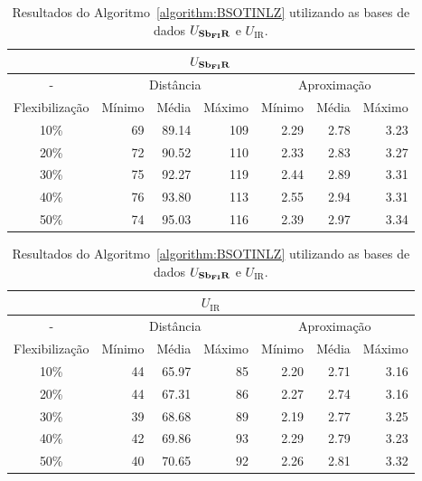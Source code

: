 \begin{table}[!htb]
  \caption{Resultados do Algoritmo~\ref{algorithm:BSOTINLZ} utilizando as bases de dados $U_{\textbf{Sb\textsubscript{FI}R}}{}$ e $U_{\text{IR}}$.}
  \label{table:APQPJYRX}
  \centering
  \begin{tabular}{|c|r|r|r|r|r|r|}
    \hline
    \multicolumn{7}{|c|}{$U_{\textbf{Sb\textsubscript{FI}R}}{}$}                                                                       \\ \hline
      -            & \multicolumn{3}{c|}{Distância}             & \multicolumn{3}{c|}{Aproximação}           \\ \hline
    Flexibilização & Mínimo       & Média        & Máximo       & Mínimo       & Média        & Máximo       \\ \hline  
    10\%           & 69           & 89.14        & 109          & 2.29         & 2.78         & 3.23         \\ \hline
    20\%           & 72           & 90.52        & 110          & 2.33         & 2.83         & 3.27         \\ \hline
    30\%           & 75           & 92.27        & 119          & 2.44         & 2.89         & 3.31         \\ \hline
    40\%           & 76           & 93.80        & 113          & 2.55         & 2.94         & 3.31         \\ \hline
    50\%           & 74           & 95.03        & 116          & 2.39         & 2.97         & 3.34         \\ \hline    
  \end{tabular}

  \vspace{5mm}

  \begin{tabular}{|c|r|r|r|r|r|r|}
    \hline
    \multicolumn{7}{|c|}{$U_{\text{IR}}$}                                                                    \\ \hline
      -            & \multicolumn{3}{c|}{Distância}             & \multicolumn{3}{c|}{Aproximação}           \\ \hline
    Flexibilização & Mínimo       & Média        & Máximo       & Mínimo       & Média        & Máximo       \\ \hline  
    10\%           & 44           & 65.97        & 85           & 2.20         & 2.71         & 3.16         \\ \hline
    20\%           & 44           & 67.31        & 86           & 2.27         & 2.74         & 3.16         \\ \hline
    30\%           & 39           & 68.68        & 89           & 2.19         & 2.77         & 3.25         \\ \hline
    40\%           & 42           & 69.86        & 93           & 2.29         & 2.79         & 3.23         \\ \hline
    50\%           & 40           & 70.65        & 92           & 2.26         & 2.81         & 3.32         \\ \hline    
  \end{tabular}
\end{table}


